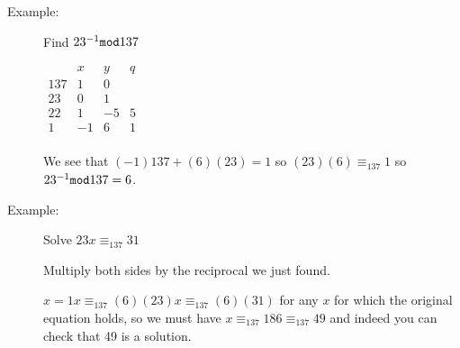 \documentclass[12pt]{article}
\begin{document}
\begin{description}


\item[Example:]  Find $23^{-1}{\tt mod}137$

$\begin{array}{cccc}
& x& y & q \\ \hline
137 & 1 & 0 & \\

23 & 0 & 1 & \\

22 & 1 & -5 & 5 \\

1 & -1 & 6 & 1 \\

\end{array}$

We see that $(-1)137 + (6)(23) = 1$ so $(23)(6) \equiv_{137} 1$ so $23^{-1} {\tt mod} 137 = 6$.

\item[Example:]  Solve $23x \equiv_{137} 31$

Multiply both sides by the reciprocal we just found.

$x = 1x \equiv_{137} (6)(23)x \equiv_{137} (6)(31)$ for any $x$ for which the original equation holds,
so we must have $x \equiv_{137} 186 \equiv_{137} 49$ and indeed you can check that 49 is a solution.

\end{description}
\end{document}
